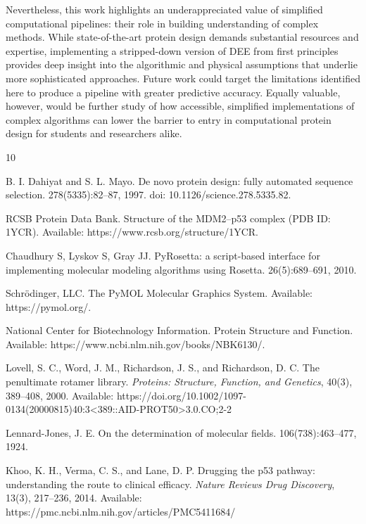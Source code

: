Nevertheless, this work highlights an underappreciated value of simplified computational pipelines: their role in building understanding of complex methods. While state-of-the-art protein design demands substantial resources and expertise, implementing a stripped-down version of DEE from first principles provides deep insight into the algorithmic and physical assumptions that underlie more sophisticated approaches. Future work could target the limitations identified here to produce a pipeline with greater predictive accuracy. Equally valuable, however, would be further study of how accessible, simplified implementations of complex algorithms can lower the barrier to entry in computational protein design for students and researchers alike.
\begin{thebibliography}{10}

 B. I. Dahiyat and S. L. Mayo.
\newblock De novo protein design: fully automated sequence selection.
 278(5335):82--87, 1997. doi: 10.1126/science.278.5335.82.

 RCSB Protein Data Bank.
\newblock Structure of the MDM2–p53 complex (PDB ID: 1YCR).
\newblock Available: https://www.rcsb.org/structure/1YCR.

 Chaudhury S, Lyskov S, Gray JJ.
\newblock PyRosetta: a script-based interface for implementing molecular 
modeling algorithms using Rosetta.
 26(5):689--691, 2010.

 Schrödinger, LLC.
\newblock The PyMOL Molecular Graphics System.
\newblock Available: https://pymol.org/.

 National Center for Biotechnology Information.
\newblock Protein Structure and Function.
\newblock Available: https://www.ncbi.nlm.nih.gov/books/NBK6130/.

 Lovell, S. C., Word, J. M., Richardson, J. S., and Richardson, D. C.
\newblock The penultimate rotamer library.
\newblock \textit{Proteins: Structure, Function, and Genetics}, 40(3), 389--408, 2000.
\newblock Available: https://doi.org/10.1002/1097-0134(20000815)40:3<389::AID-PROT50>3.0.CO;2-2

 Lennard-Jones, J. E.
\newblock On the determination of molecular fields.
 106(738):463--477, 1924.

 Khoo, K. H., Verma, C. S., and Lane, D. P.
\newblock Drugging the p53 pathway: understanding the route to clinical efficacy.
\newblock \textit{Nature Reviews Drug Discovery}, 13(3), 217--236, 2014.
\newblock Available: https://pmc.ncbi.nlm.nih.gov/articles/PMC5411684/

\end{thebibliography}
